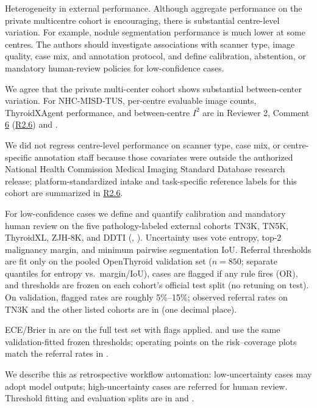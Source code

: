 \label{rev:R1.3}
\begin{reviewercomment}
Heterogeneity in external performance. Although aggregate performance on the private multicentre cohort is encouraging, there is substantial centre-level variation. For example, nodule segmentation performance is much lower at some centres. The authors should investigate associations with scanner type, image quality, case mix, and annotation protocol, and define calibration, abstention, or mandatory human-review policies for low-confidence cases.
\end{reviewercomment}
\begin{authorresponse}
We agree that the private multi-center cohort shows substantial between-center variation. For NHC-MISD-TUS, per-centre evaluable image counts, ThyroidXAgent performance, and between-centre $I^2$ are in Reviewer 2, Comment \hyperref[rev:R2.6]{6} (\hyperref[rev:R2.6]{R2.6}) and .\par
We did not regress centre-level performance on scanner type, case mix, or centre-specific annotation staff because those covariates were outside the authorized National Health Commission Medical Imaging Standard Database research release; platform-standardized intake and task-specific reference labels for this cohort are summarized in \hyperref[rev:R2.6]{R2.6}.\par
For low-confidence cases we define and quantify calibration and mandatory human review on the five pathology-labeled external cohorts TN3K, TN5K, ThyroidXL, ZJH-8K, and DDTI (, ). Uncertainty uses vote entropy, top-2 malignancy margin, and minimum pairwise segmentation IoU. Referral thresholds are fit only on the pooled OpenThyroid validation set ($n{=}850$; separate quantiles for entropy vs.\ margin/IoU), cases are flagged if any rule fires (OR), and thresholds are frozen on each cohort's official test split (no retuning on test). On validation, flagged rates are roughly 5\%--15\%; observed referral rates on TN3K and the other listed cohorts are in  (one decimal place).\par
ECE/Brier in  are on the full test set with flags applied.  and  use the same validation-fitted frozen thresholds; operating points on the risk–coverage plots match the referral rates in .\par
We describe this as retrospective workflow automation: low-uncertainty cases may adopt model outputs; high-uncertainty cases are referred for human review. Threshold fitting and evaluation splits are in  and .\par
\par
\end{authorresponse}
